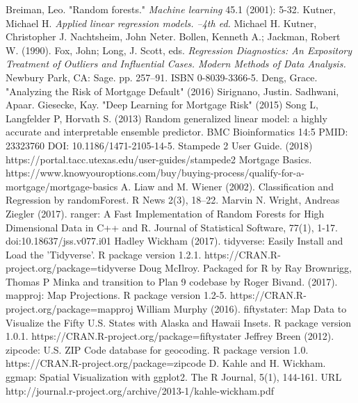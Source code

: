 \newpage
\begin{thebibliography}{99}
Breiman, Leo. "Random forests." \textit{Machine learning} 45.1 (2001): 5-32.
Kutner, Michael H. 
\textit{Applied linear regression models. --4th ed.} Michael H. Kutner, Christopher J. Nachtsheim, John Neter.
Bollen, Kenneth A.; Jackman, Robert W. (1990). Fox, John; Long, J. Scott, eds. 
\textit{Regression Diagnostics: An Expository Treatment of Outliers and Influential Cases. Modern Methods of Data Analysis.}
Newbury Park, CA: Sage. pp. 257–91. ISBN 0-8039-3366-5.
Deng, Grace. "Analyzing the Risk of Mortgage Default" (2016)
Sirignano, Justin. Sadhwani, Apaar. Giesecke, Kay. "Deep Learning for Mortgage Risk" (2015)
Song L, Langfelder P, Horvath S. (2013) Random generalized linear model: a highly accurate and interpretable ensemble predictor. BMC Bioinformatics 14:5 PMID: 23323760 DOI: 10.1186/1471-2105-14-5.
Stampede 2 User Guide. (2018) https://portal.tacc.utexas.edu/user-guides/stampede2
Mortgage Basics. https://www.knowyouroptions.com/buy/buying-process/qualify-for-a-mortgage/mortgage-basics
A. Liaw and M. Wiener (2002). Classification and Regression by
randomForest. R News 2(3), 18--22.
Marvin N. Wright, Andreas Ziegler (2017). ranger: A Fast Implementation
of Random Forests for High Dimensional Data in C++ and R. Journal of
Statistical Software, 77(1), 1-17. doi:10.18637/jss.v077.i01
Hadley Wickham (2017). tidyverse: Easily Install and Load the
'Tidyverse'. R package version 1.2.1.
https://CRAN.R-project.org/package=tidyverse
Doug McIlroy. Packaged for R by Ray Brownrigg, Thomas P Minka and
transition to Plan 9 codebase by Roger Bivand. (2017). mapproj: Map
Projections. R package version 1.2-5.
https://CRAN.R-project.org/package=mapproj
William Murphy (2016). fiftystater: Map Data to Visualize the Fifty U.S.
States with Alaska and Hawaii Insets. R package version 1.0.1.
https://CRAN.R-project.org/package=fiftystater
Jeffrey Breen (2012). zipcode: U.S. ZIP Code database for geocoding. R
package version 1.0. https://CRAN.R-project.org/package=zipcode
D. Kahle and H. Wickham. ggmap: Spatial Visualization with ggplot2. The
R Journal, 5(1), 144-161. URL
http://journal.r-project.org/archive/2013-1/kahle-wickham.pdf
\end{thebibliography}
